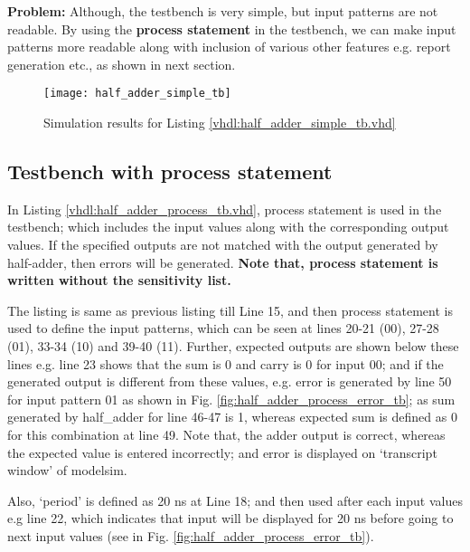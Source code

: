 \textbf{Problem: } Although, the testbench is very simple, but input patterns are not readable. By using the \textbf{process statement} in the testbench, we can make input patterns more readable along with inclusion  of various other features e.g. report generation etc., as shown in next section. 



\begin{figure}[!h]
	\centering
	\texttt{[image: half\_adder\_simple\_tb]}
	\caption{Simulation results for Listing \ref{vhdl:half_adder_simple_tb.vhd}}
	\label{fig:half_adder_simple_tb}
\end{figure}


\subsection{Testbench with process statement} \label{sec:tb_with_process_statement}
In Listing \ref{vhdl:half_adder_process_tb.vhd}, process statement is used in the testbench; which includes the input values along with the corresponding output values.  If the specified outputs are not matched with the output generated by half-adder, then errors will be generated. \textbf{Note that, process statement is written without the sensitivity list.}

\begin{explanation}
	The listing is same as previous listing till Line 15, and then process statement is used to define the input patterns, which can be seen at lines 20-21 (00),  27-28 (01), 33-34 (10) and 39-40 (11). Further, expected outputs are shown below these lines e.g. line 23 shows that the sum is 0 and carry is 0 for input 00; and if the generated output is different from these values, e.g. error is generated by line 50 for input pattern 01 as shown in Fig. \ref{fig:half_adder_process_error_tb}; as sum generated by half\_adder for line 46-47 is 1, whereas expected sum is defined as 0 for this combination at line 49. Note that, the adder output is correct, whereas the expected value is entered incorrectly; and error is displayed on `transcript window' of modelsim. 
	
	Also, `period' is defined as 20 ns at Line 18; and then used after each input values e.g line 22, which indicates that input will be displayed for 20 ns before going to next input values (see in Fig. \ref{fig:half_adder_process_error_tb}).
\end{explanation}

